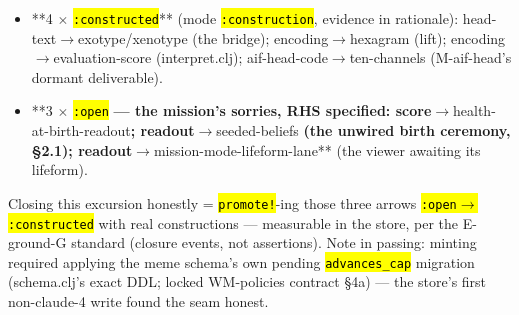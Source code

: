 \documentclass[11pt,oneside]{article}
\newcommand{\scopehl}[1]{\texttt{\hl{#1}}}
\begin{document}
\begin{phasebox}[title={2. MAP (2026-06-10) --- autopsy + the futon5 improvisation apparatus}]
\begin{subbox}[title={2.5 This mission's own wiring diagram --- written into the meme store (2026-06-10)}]
\begin{itemize}[leftmargin=1.2em,itemsep=1pt]
\item **4 $\times$ \scopehl{:constructed}** (mode \scopehl{:construction}, evidence in rationale): head-text$\rightarrow$exotype/xenotype (the bridge); encoding$\rightarrow$hexagram (lift); encoding$\rightarrow$evaluation-score (interpret.clj); aif-head-code$\rightarrow$ten-channels (M-aif-head's dormant deliverable).
\item **3 $\times$ \scopehl{:open}\textbf{ --- the mission's sorries, RHS specified: score$\rightarrow$}health-at-birth-readout\textbf{; readout$\rightarrow$}seeded-beliefs\textbf{ (the unwired birth ceremony, \S{}2.1); readout$\rightarrow$}mission-mode-lifeform-lane** (the viewer awaiting its lifeform).
\end{itemize}

Closing this excursion honestly = \scopehl{promote!}-ing those three arrows
\scopehl{:open$\rightarrow$:constructed} with real constructions --- measurable in the store, per
the E-ground-G standard (closure events, not assertions). Note in passing:
minting required applying the meme schema's own pending \scopehl{advances\_cap}
migration (schema.clj's exact DDL; locked WM-policies contract \S{}4a) --- the
store's first non-claude-4 write found the seam honest.

\end{subbox}
\end{phasebox}
\end{document}
